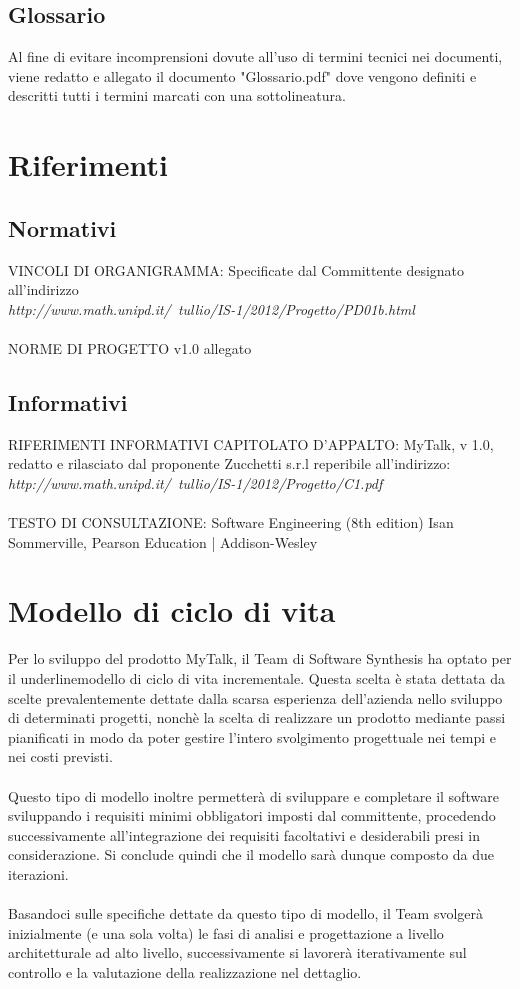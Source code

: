 \subsection{Glossario}
Al fine di evitare incomprensioni dovute all'uso di termini tecnici nei documenti, viene redatto e allegato il documento "Glossario.pdf" dove vengono definiti e descritti tutti i termini marcati con una sottolineatura.

\section{Riferimenti}
\subsection{Normativi}
VINCOLI DI ORGANIGRAMMA: Specificate dal Committente designato all'indirizzo\\ \textit{http://www.math.unipd.it/~tullio/IS-1/2012/Progetto/PD01b.html} \\\\
NORME DI PROGETTO  v1.0 allegato

\subsection{Informativi}
RIFERIMENTI INFORMATIVI
CAPITOLATO D'APPALTO: MyTalk, v 1.0, redatto e rilasciato dal proponente Zucchetti s.r.l reperibile all'indirizzo:\\ \textit{http://www.math.unipd.it/~tullio/IS-1/2012/Progetto/C1.pdf} \\\\
TESTO DI CONSULTAZIONE: Software Engineering (8th edition) Isan Sommerville, Pearson Education | Addison-Wesley

\clearpage
\section{Modello di ciclo di vita}
Per lo sviluppo del prodotto MyTalk, il Team di Software Synthesis ha optato per il underline{modello di ciclo di vita} incrementale. Questa scelta è stata dettata da scelte prevalentemente dettate dalla scarsa esperienza dell'azienda nello sviluppo di determinati progetti, nonchè la scelta di realizzare un prodotto mediante passi pianificati in modo da poter gestire l'intero svolgimento progettuale nei tempi e nei costi previsti.\\\\
Questo tipo di modello inoltre permetterà di sviluppare e completare il software sviluppando i requisiti minimi obbligatori imposti dal committente, procedendo successivamente all'integrazione dei requisiti facoltativi e desiderabili presi in considerazione. Si conclude quindi che il modello sarà dunque composto da due iterazioni.\\\\
Basandoci sulle specifiche dettate da questo tipo di modello, il Team svolgerà inizialmente (e una sola volta) le fasi di analisi e progettazione a livello architetturale ad alto livello, successivamente si lavorerà iterativamente sul controllo e la valutazione della realizzazione nel dettaglio.\\

